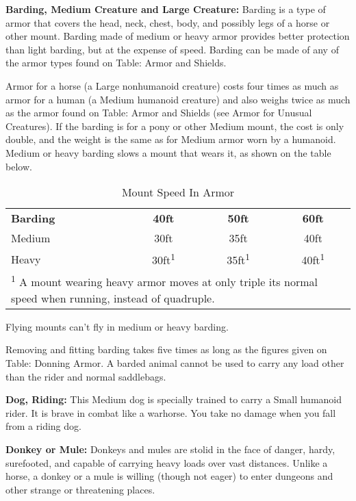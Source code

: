 \textbf{Barding, Medium Creature and Large Creature:} Barding is a type of armor 
that covers the head, neck, chest, body, and possibly legs of a horse or other 
mount. Barding made of medium or heavy armor provides better protection than light 
barding, but at the expense of speed. Barding can be made of any of the armor types 
found on Table: Armor and Shields.

Armor for a horse (a Large nonhumanoid creature) costs four times as much as armor 
for a human (a Medium humanoid creature) and also weighs twice as much as the armor 
found on Table: Armor and Shields (see Armor for Unusual Creatures). If the barding 
is for a pony or other Medium mount, the cost is only double, and the weight is 
the same as for Medium armor worn by a humanoid. Medium or heavy barding slows 
a mount that wears it, as shown on the table below.

\begin{table}[htb]
\caption{Mount Speed In Armor}
\centering
\begin{tabular}{l c c c}
\textbf{Barding} & \textbf{40ft} & \textbf{50ft} & \textbf{60ft}\\
Medium & 30ft & 35ft & 40ft\\
Heavy & 30ft\textsuperscript{1} & 35ft\textsuperscript{1} & 40ft\textsuperscript{1}\\
\multicolumn{4}{p{6cm}}{\textsuperscript{1} A mount wearing heavy armor moves at only triple its normal speed when running, instead of quadruple.}\\
\end{tabular}
\end{table}

Flying mounts can't fly in medium or heavy barding.

Removing and fitting barding takes five times as long as the figures given on Table: 
Donning Armor. A barded animal cannot be used to carry any load other than the 
rider and normal saddlebags.

\textbf{Dog, Riding:} This Medium dog is specially trained to carry a Small humanoid 
rider. It is brave in combat like a warhorse. You take no damage when you fall 
from a riding dog.

\textbf{Donkey or Mule:} Donkeys and mules are stolid in the face of danger, hardy, 
surefooted, and capable of carrying heavy loads over vast distances. Unlike a horse, 
a donkey or a mule is willing (though not eager) to enter dungeons and other strange 
or threatening places.

